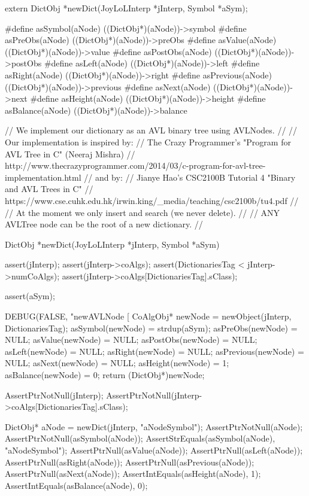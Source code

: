 \startTestSuite[newDict]

\startCHeader
extern DictObj *newDict(JoyLoLInterp *jInterp, Symbol *aSym);
\stopCHeader

\startCHeader
#define asSymbol(aNode)   ((DictObj*)(aNode))->symbol
#define asPreObs(aNode)   ((DictObj*)(aNode))->preObs
#define asValue(aNode)    ((DictObj*)(aNode))->value
#define asPostObs(aNode)  ((DictObj*)(aNode))->postObs
#define asLeft(aNode)     ((DictObj*)(aNode))->left
#define asRight(aNode)    ((DictObj*)(aNode))->right
#define asPrevious(aNode) ((DictObj*)(aNode))->previous
#define asNext(aNode)     ((DictObj*)(aNode))->next
#define asHeight(aNode)   ((DictObj*)(aNode))->height
#define asBalance(aNode)  ((DictObj*)(aNode))->balance
\stopCHeader
{}

\startCCode
// We implement our dictionary as an AVL binary tree using AVLNodes.
//
// Our implementation is inspired by:
// The Crazy Programmer's "Program for AVL Tree in C" (Neeraj Mishra)
// http://www.thecrazyprogrammer.com/2014/03/c-program-for-avl-tree-implementation.html
// and by:
// Jianye Hao's CSC2100B Tutorial 4 "Binary and AVL Trees in C"
// https://www.cse.cuhk.edu.hk/irwin.king/_media/teaching/csc2100b/tu4.pdf
//
// At the moment we only insert and search (we never delete).
//
// ANY AVLTree node can be the root of a new dictionary.
//

DictObj *newDict(JoyLoLInterp *jInterp, Symbol *aSym) {
  assert(jInterp);
  assert(jInterp->coAlgs);
  assert(DictionariesTag < jInterp->numCoAlgs);
  assert(jInterp->coAlgs[DictionariesTag].sClass);
  
  assert(aSym);
  
  DEBUG(FALSE, "newAVLNode [%
  CoAlgObj* newNode   = newObject(jInterp, DictionariesTag);
  asSymbol(newNode)   = strdup(aSym);
  asPreObs(newNode)   = NULL;
  asValue(newNode)    = NULL;
  asPostObs(newNode)  = NULL;
  asLeft(newNode)     = NULL;
  asRight(newNode)    = NULL;
  asPrevious(newNode) = NULL;
  asNext(newNode)     = NULL;
  asHeight(newNode)   = 1;
  asBalance(newNode)  = 0;
  return (DictObj*)newNode;
}
\stopCCode


\startCTest
  AssertPtrNotNull(jInterp);
  AssertPtrNotNull(jInterp->coAlgs[DictionariesTag].sClass);

  DictObj* aNode = newDict(jInterp, "aNodeSymbol");
  AssertPtrNotNull(aNode);
  AssertPtrNotNull(asSymbol(aNode));
  AssertStrEquals(asSymbol(aNode), "aNodeSymbol");
  AssertPtrNull(asValue(aNode));
  AssertPtrNull(asLeft(aNode));
  AssertPtrNull(asRight(aNode));
  AssertPtrNull(asPrevious(aNode));
  AssertPtrNull(asNext(aNode));
  AssertIntEquals(asHeight(aNode), 1);
  AssertIntEquals(asBalance(aNode), 0);
\stopCTest
\stopTestCase
\stopTestSuite

